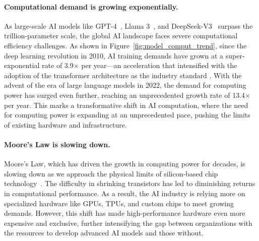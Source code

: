 \paragraph{Computational demand is growing exponentially.}
As large-scale AI models like GPT-4~\cite{openai2023gpt4}, Llama 3~\cite{meta2024llama3.1}, and DeepSeek-V3~\cite{liu2024deepseek} surpass the trillion-parameter scale, the global AI landscape faces severe computational efficiency challenges. As shown in Figure~\ref{fig:model_comput_trend}, since the deep learning revolution in 2010, AI training demands have grown at a super-exponential rate of 3.9$\times$ per year—an acceleration that intensified with the adoption of the transformer architecture as the industry standard \cite{vaswani2017attention}. With the advent of the era of large language models in 2022, the demand for computing power has surged even further, reaching an unprecedented growth rate of 13.4$\times$ per year. This marks a transformative shift in AI computation, where the need for computing power is expanding at an unprecedented pace, pushing the limits of existing hardware and infrastructure.




\paragraph{Moore's Law is slowing down.}
Moore's Law, which has driven the growth in computing power for decades, is slowing down as we approach the physical limits of silicon-based chip technology~\cite{kressel2023end}. The difficulty in shrinking transistors has led to diminishing returns in computational performance. As a result, the AI industry is relying more on specialized hardware like GPUs, TPUs, and custom chips to meet growing demands. However, this shift has made high-performance hardware even more expensive and exclusive, further intensifying the gap between organizations with the resources to develop advanced AI models and those without.

